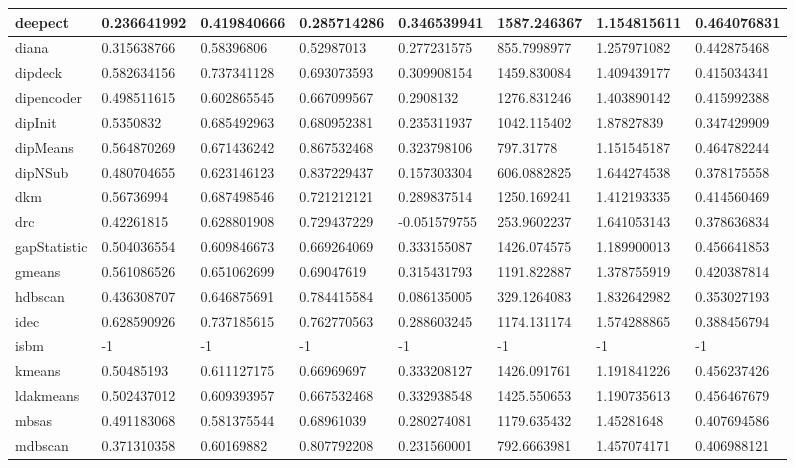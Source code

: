 \begin{table}[H]
\begin{tabular}{|l|l|l|l|l|l|l|l|}
\hline
deepect & 0.236641992 & 0.419840666 & 0.285714286 & 0.346539941 & 1587.246367 & 1.154815611 & 0.464076831 \\
\hline
diana & 0.315638766 & 0.58396806 & 0.52987013 & 0.277231575 & 855.7998977 & 1.257971082 & 0.442875468 \\
\hline
dipdeck & 0.582634156 & 0.737341128 & 0.693073593 & 0.309908154 & 1459.830084 & 1.409439177 & 0.415034341 \\
\hline
dipencoder & 0.498511615 & 0.602865545 & 0.667099567 & 0.2908132 & 1276.831246 & 1.403890142 & 0.415992388 \\
\hline
dipInit & 0.5350832 & 0.685492963 & 0.680952381 & 0.235311937 & 1042.115402 & 1.87827839 & 0.347429909 \\
\hline
dipMeans & 0.564870269 & 0.671436242 & 0.867532468 & 0.323798106 & 797.31778 & 1.151545187 & 0.464782244 \\
\hline
dipNSub & 0.480704655 & 0.623146123 & 0.837229437 & 0.157303304 & 606.0882825 & 1.644274538 & 0.378175558 \\
\hline
dkm & 0.56736994 & 0.687498546 & 0.721212121 & 0.289837514 & 1250.169241 & 1.412193335 & 0.414560469 \\
\hline
drc & 0.42261815 & 0.628801908 & 0.729437229 & -0.051579755 & 253.9602237 & 1.641053143 & 0.378636834 \\
\hline
gapStatistic & 0.504036554 & 0.609846673 & 0.669264069 & 0.333155087 & 1426.074575 & 1.189900013 & 0.456641853 \\
\hline
gmeans & 0.561086526 & 0.651062699 & 0.69047619 & 0.315431793 & 1191.822887 & 1.378755919 & 0.420387814 \\
\hline
hdbscan & 0.436308707 & 0.646875691 & 0.784415584 & 0.086135005 & 329.1264083 & 1.832642982 & 0.353027193 \\
\hline
idec & 0.628590926 & 0.737185615 & 0.762770563 & 0.288603245 & 1174.131174 & 1.574288865 & 0.388456794 \\
\hline
isbm & -1 & -1 & -1 & -1 & -1 & -1 & -1 \\
\hline
kmeans & 0.50485193 & 0.611127175 & 0.66969697 & 0.333208127 & 1426.091761 & 1.191841226 & 0.456237426 \\
\hline
ldakmeans & 0.502437012 & 0.609393957 & 0.667532468 & 0.332938548 & 1425.550653 & 1.190735613 & 0.456467679 \\
\hline
mbsas & 0.491183068 & 0.581375544 & 0.68961039 & 0.280274081 & 1179.635432 & 1.45281648 & 0.407694586 \\
\hline
mdbscan & 0.371310358 & 0.60169882 & 0.807792208 & 0.231560001 & 792.6663981 & 1.457074171 & 0.406988121 \\

\end{tabular}
\end{table}
